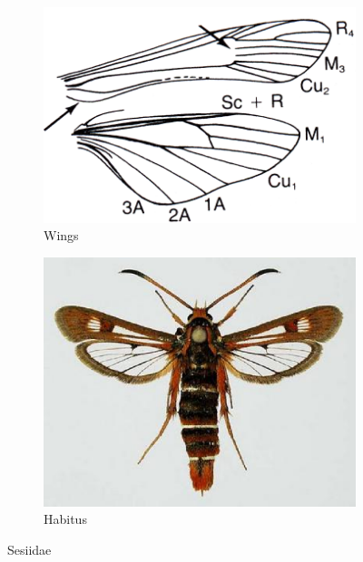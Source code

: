 \documentclass[letterpaper, 11pt]{article}
\begin{document}
\begin{figure}[ht!]
    \centering
    \begin{subfigure}[ht!]{0.45\textwidth}
        \includegraphics[width=\textwidth]{image42}
        \caption{Wings}
        \label{fig:sesiid1}
    \end{subfigure}
    \qquad %
    \begin{subfigure}[ht!]{0.45\textwidth}
        \includegraphics[width=\textwidth]{image41}
        \caption{Habitus}
        \label{fig:sesiid2}
    \end{subfigure}
    \caption{Sesiidae}\label{fig:sesiids}
\end{figure}
\end{document}

